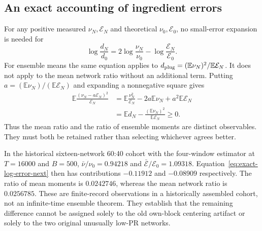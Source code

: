 \subsection{An exact accounting of ingredient errors}
For any positive measured $\nu_N,\mathcal E_N$ and theoretical
$\nu_0,\mathcal E_0$, no small-error expansion is needed for
\begin{equation}
 \log\frac{d_N}{d_0}
 =2\log\frac{\nu_N}{\nu_0}
  -\log\frac{\mathcal E_N}{\mathcal E_0}.
 \label{eq:exact-log-error-next}
\end{equation}
For ensemble means the same equation applies to
$d_{\rm plug}=(\mathbb E\nu_N)^2/\mathbb E\mathcal E_N$.
It does not apply to the mean network ratio without an additional term.
Putting $a=(\mathbb E\nu_N)/(\mathbb E\mathcal E_N)$ and expanding a
nonnegative square gives
\begin{align}
 \mathbb E\frac{(\nu_N-a\mathcal E_N)^2}{\mathcal E_N}
 &=\mathbb E\frac{\nu_N^2}{\mathcal E_N}
       -2a\mathbb E\nu_N+a^2\mathbb E\mathcal E_N\\
 &=\mathbb E d_N-\frac{(\mathbb E\nu_N)^2}
                            {\mathbb E\mathcal E_N}\ge0.
\end{align}
Thus the mean ratio and the ratio of ensemble moments are distinct observables.
They must both be retained rather than selecting whichever agrees better.

In the historical sixteen-network 60:40 cohort with the four-window estimator
at $T=16000$ and $B=500$, $\bar\nu/\nu_0=0.94218$ and
$\bar{\mathcal E}/\mathcal E_0=1.09318$. Equation~\eqref{eq:exact-log-error-next}
then has contributions $-0.11912$ and $-0.08909$ respectively.
The ratio of mean moments is $0.0242746$, whereas the mean network ratio is
$0.0256785$. These are finite-record observations in a historically assembled
cohort, not an infinite-time ensemble theorem. They establish that the
remaining difference cannot be assigned solely to the old own-block
centering artifact or solely to the two original unusually low-PR networks.

